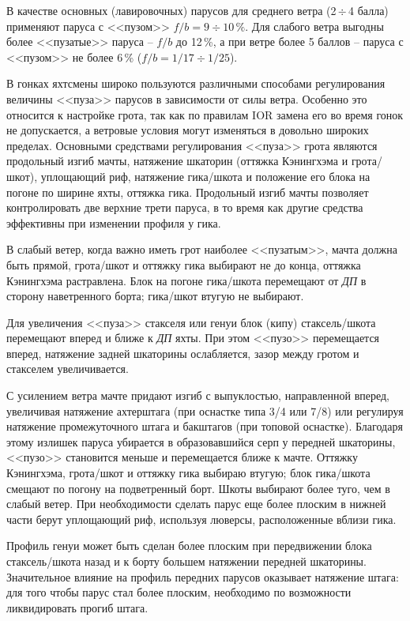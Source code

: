 \documentclass[a4paper, 12pt, twoside, final, book, russian, fittopage, cyremdash]{ncc}
\newcommand{\otdo}{\,\ensuremath{\div}\,}
\newcommand{\motdo}{\div}
\begin{document}
В качестве основных (лавировочных) парусов для среднего ветра (2\otdo 4 балла) применяют паруса с <<пузом>> $f/b=9\motdo 10\,\%$. Для слабого ветра выгодны более <<пузатые>> паруса \--- $f/b$ до 12\,\%, а при ветре более 5 баллов \--- паруса с <<пузом>> не более 6\,\% ($f/b=1/17\motdo 1/25$). 

В гонках яхтсмены широко пользуются различными способами регулирования величины <<пуза>> парусов в зависимости от силы ветра. Особенно это относится к настройке грота, так как по правилам IOR замена его во время гонок не допускается, а ветровые условия могут изменяться в довольно широких пределах. Основными средствами регулирования <<пуза>> грота являются продольный изгиб мачты, натяжение шкаторин (оттяжка Кэнингхэма и грота\-/шкот), уплощающий риф, натяжение гика\-/шкота и положение его блока на погоне по ширине яхты, оттяжка гика. Продольный изгиб мачты позволяет контролировать две верхние трети паруса, в то время как другие средства эффективны при изменении профиля у гика.

В слабый ветер, когда важно иметь грот наиболее <<пузатым>>, мачта должна быть прямой, грота\-/шкот и оттяжку гика выбирают не до конца, оттяжка Кэнингхэма растравлена. Блок на погоне гика\-/шкота перемещают от \textit{ДП} в сторону наветренного борта; гика\-/шкот втугую не выбирают.

Для увеличения <<пуза>> стакселя или генуи блок (кипу) стаксель\-/шкота перемещают вперед и ближе к \textit{ДП} яхты. При этом <<пузо>> перемещается вперед, натяжение задней шкаторины ослабляется, зазор между гротом и стакселем увеличивается. 

С усилением ветра мачте придают изгиб с выпуклостью, направленной вперед, увеличивая натяжение ахтерштага (при оснастке типа 3/4 или 7/8) или регулируя натяжение промежуточного штага и бакштагов (при топовой оснастке). Благодаря этому излишек паруса убирается в образовавшийся серп у передней шкаторины, <<пузо>> становится меньше и перемещается ближе к мачте. Оттяжку Кэнингхэма, грота\-/шкот и оттяжку гика выбираю втугую; блок гика\-/шкота смещают по погону на подветренный борт. Шкоты выбирают более туго, чем в слабый ветер. При необходимости сделать парус еще более плоским в нижней части берут уплощающий риф, используя люверсы, расположенные вблизи гика.

Профиль генуи может быть сделан более плоским при передвижении блока стаксель\-/шкота назад и к борту большем натяжении передней шкаторины. Значительное влияние на профиль передних парусов оказывает натяжение штага: для того чтобы парус стал более плоским, необходимо по возможности ликвидировать прогиб штага.
\end{document}
